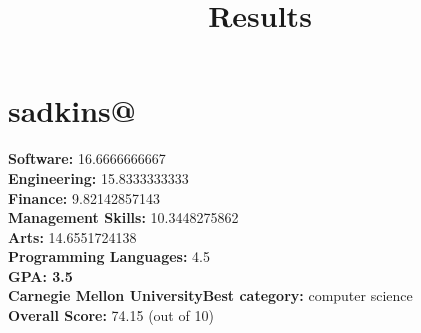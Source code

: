 \documentclass{article}
\title{Results}
\begin{document}
\section{sadkins@}
\textbf{Software:} 16.6666666667\\
\textbf{Engineering:} 15.8333333333\\
\textbf{Finance:} 9.82142857143\\
\textbf{Management Skills:} 10.3448275862\\
\textbf{Arts:} 14.6551724138\\
\textbf{Programming Languages:} 4.5\\
\textbf{GPA: 3.5}\\
\textbf{Carnegie Mellon University}\textbf{Best category: } computer science\\
\textbf{Overall Score: }74.15 (out of 10)
\end{document}
